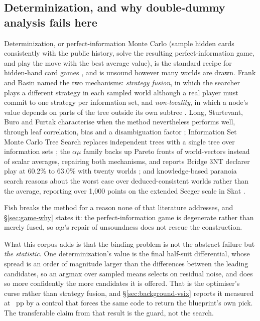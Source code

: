 \subsection{Determinization, and why double-dummy analysis fails here}
\label{sec:related-determinization}

Determinization, or perfect-information Monte Carlo (sample hidden cards consistently with the
public history, solve the resulting perfect-information game, and play the move with the best average
value), is the standard recipe for hidden-hand card games \cite{levy,ginsberg-gib}, and is
unsound however many worlds are drawn. Frank and Basin named the two mechanisms: \emph{strategy
fusion}, in which the searcher plays a different strategy in each sampled world although a real
player must commit to one strategy per information set, and \emph{non-locality}, in which a node's
value depends on parts of the tree outside its own subtree
\cite{frank-basin-ai,frank-basin-aaai}. Long, Sturtevant, Buro and Furtak characterise when the
method nevertheless performs well, through leaf correlation, bias and a disambiguation factor
\cite{long-pimc}; Information Set Monte Carlo Tree Search replaces independent trees with a single
tree over information sets \cite{cowling-ismcts,goodman-ris}; the $\alpha\mu$ family backs up Pareto
fronts of world-vectors instead of scalar averages, repairing both mechanisms, and reports Bridge
3NT declarer play at 60.2\% to 63.0\% with twenty worlds \cite{cazenave2019alphamu}; and
knowledge-based paranoia search reasons about the worst case over deduced-consistent worlds rather
than the average, reporting over 1{,}000 points on the extended Seeger scale in Skat
\cite{edelkamp2021paranoia}.

Fish breaks the method for a reason none of that literature addresses, and
\S\ref{sec:game-why} states it: the perfect-information game is degenerate rather than merely
fused, so $\alpha\mu$'s repair of unsoundness does not rescue the construction.

What this corpus adds is that the binding problem is not the abstract failure but \emph{the
statistic}. One determinization's value is the final half-suit differential, whose spread is an
order of magnitude larger than the differences between the leading candidates, so an argmax over
sampled means selects on residual noise, and does so more confidently the more candidates it is
offered. That is the optimiser's curse rather than strategy fusion, and \S\ref{sec:background-vsix}
reports it measured at \vsixCurseGap{}~pp by a control that forces the same code to return the
blueprint's own pick. The transferable claim from that result is the guard, not the search.

